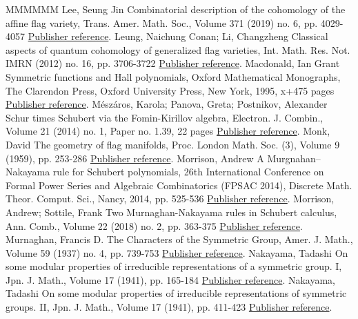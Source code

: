 \begin{thebibliography}{MMMMMM}
 Lee, Seung Jin Combinatorial description of the cohomology of the affine flag variety, Trans. Amer. Math. Soc., Volume 371 (2019) no. 6, pp. 4029-4057 \href{https://alco.centre-mersenne.org/articles/10.5802/alco.427/#Lee}{Publisher reference}.
 Leung, Naichung Conan; Li, Changzheng Classical aspects of quantum cohomology of generalized flag varieties, Int. Math. Res. Not. IMRN (2012) no. 16, pp. 3706-3722 \href{https://alco.centre-mersenne.org/articles/10.5802/alco.427/#LeungLi2012}{Publisher reference}.
 Macdonald, Ian Grant Symmetric functions and Hall polynomials, Oxford Mathematical Monographs, The Clarendon Press, Oxford University Press, New York, 1995, x+475 pages \href{https://alco.centre-mersenne.org/articles/10.5802/alco.427/#Macdonald}{Publisher reference}.
 Mészáros, Karola; Panova, Greta; Postnikov, Alexander Schur times Schubert via the Fomin-Kirillov algebra, Electron. J. Combin., Volume 21 (2014) no. 1, Paper no. 1.39, 22 pages \href{https://alco.centre-mersenne.org/articles/10.5802/alco.427/#MPP}{Publisher reference}.
 Monk, David The geometry of flag manifolds, Proc. London Math. Soc. (3), Volume 9 (1959), pp. 253-286 \href{https://alco.centre-mersenne.org/articles/10.5802/alco.427/#Monk}{Publisher reference}.
 Morrison, Andrew A Murgnahan–Nakayama rule for Schubert polynomials, 26th International Conference on Formal Power Series and Algebraic Combinatorics (FPSAC 2014), Discrete Math. Theor. Comput. Sci., Nancy, 2014, pp. 525-536 \href{https://alco.centre-mersenne.org/articles/10.5802/alco.427/#Morrison}{Publisher reference}.
 Morrison, Andrew; Sottile, Frank Two Murnaghan-Nakayama rules in Schubert calculus, Ann. Comb., Volume 22 (2018) no. 2, pp. 363-375 \href{https://alco.centre-mersenne.org/articles/10.5802/alco.427/#MorrisonSottile}{Publisher reference}.
 Murnaghan, Francis D. The Characters of the Symmetric Group, Amer. J. Math., Volume 59 (1937) no. 4, pp. 739-753 \href{https://alco.centre-mersenne.org/articles/10.5802/alco.427/#Mu37}{Publisher reference}.
 Nakayama, Tadashi On some modular properties of irreducible representations of a symmetric group. I, Jpn. J. Math., Volume 17 (1941), pp. 165-184 \href{https://alco.centre-mersenne.org/articles/10.5802/alco.427/#Na41a}{Publisher reference}.
 Nakayama, Tadashi On some modular properties of irreducible representations of symmetric groups. II, Jpn. J. Math., Volume 17 (1941), pp. 411-423 \href{https://alco.centre-mersenne.org/articles/10.5802/alco.427/#Na41b}{Publisher reference}.

\end{thebibliography}
